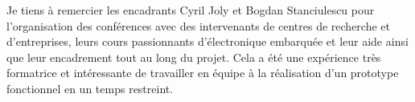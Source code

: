 \begin{titlepage}
\begin{center}
        \end{center}

        \begin{remerciements}
            Je tiens à remercier les encadrants Cyril Joly et Bogdan Stanciulescu pour 
             l'organisation des conférences avec des intervenants de centres de recherche et d'entreprises,
             leurs cours passionnants d'électronique embarquée
             et leur aide ainsi que leur encadrement tout au long du projet.
            Cela a été une expérience très formatrice et intéressante de travailler en équipe à la réalisation d'un prototype
             fonctionnel en un temps restreint.
        \end{remerciements}
    
    
        \tableofcontents

    \end{titlepage}
        

    \newpage

    \makeatother
